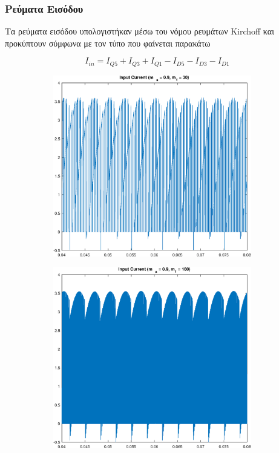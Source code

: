 \clearpage
\subsubsection*{Ρεύματα Εισόδου}
Τα ρεύματα εισόδου υπολογιστήκαν μέσω του νόμου ρευμάτων Kirchoff και προκύπτουν σύμφωνα με τον τύπο που φαίνεται παρακάτω

\begin{equation*}
	I_{in} = I_{Q5} + I_{Q3} + I_{Q1} - I_{D5} - I_{D3} - I_{D1}
\end{equation*}
\begin{figure}[h]
	\begin{subfigure}{0.49\textwidth}
		\centering
		\includegraphics[width=0.95\textwidth]{Images/4_I_in_30.eps}
	\end{subfigure}
	\begin{subfigure}{0.49\textwidth}
		\centering
		\includegraphics[width=0.95\textwidth]{Images/4_I_in_180.eps}
	\end{subfigure}
\end{figure}

